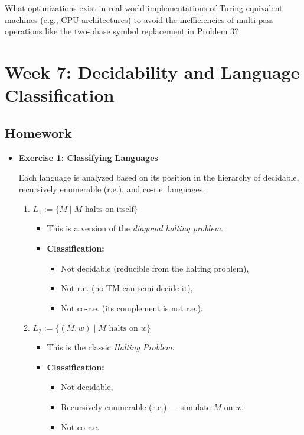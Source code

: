 \documentclass[11pt]{article}
\begin{document}
What optimizations exist in real-world implementations of Turing-equivalent machines (e.g., CPU architectures) to avoid the inefficiencies of multi-pass operations like the two-phase symbol replacement in Problem 3?

\section{Week 7: Decidability and Language Classification}

\subsection{Homework}

\begin{itemize}[leftmargin=*]

\item \textbf{Exercise 1: Classifying Languages}

Each language is analyzed based on its position in the hierarchy of decidable, recursively enumerable (r.e.), and co-r.e. languages.

\begin{enumerate}
    \item \( L_1 := \{ M \mid M \text{ halts on itself} \} \)

    \begin{itemize}
        \item This is a version of the \textit{diagonal halting problem}.
        \item \textbf{Classification:}
        \begin{itemize}
            \item Not decidable (reducible from the halting problem),
            \item Not r.e. (no TM can semi-decide it),
            \item Not co-r.e. (its complement is not r.e.).
        \end{itemize}
    \end{itemize}

    \item \( L_2 := \{ (M, w) \mid M \text{ halts on } w \} \)

    \begin{itemize}
        \item This is the classic \textit{Halting Problem}.
        \item \textbf{Classification:}
        \begin{itemize}
            \item Not decidable,
            \item Recursively enumerable (r.e.) — simulate \( M \) on \( w \),
            \item Not co-r.e.
        \end{itemize}
    \end{itemize}


\end{enumerate}
\end{itemize}
\end{document}
